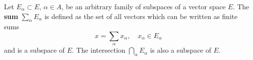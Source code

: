 Let $E_\alpha \subset E$, $\alpha \in A$, be an arbitrary family of subspaces of a vector space $E$. The \textbf{sum} $\sum_\alpha E_\alpha$ is defined as the set of all vectors which can be written as finite sums
$$x = \sum_\alpha x_\alpha, \quad x_\alpha \in E_\alpha$$
and is a subspace of $E$. The intersection $\bigcap_\alpha E_\alpha$ is also a subspace of $E$.
